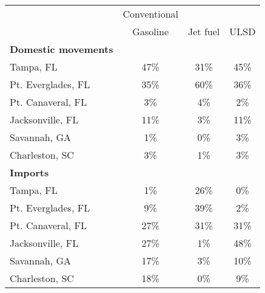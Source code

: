 \begin{tabular}{lccc}
\hline
& Conventional & & \\
& Gasoline & Jet fuel & ULSD \\
\hline
\textbf{Domestic movements} &  &  &  \\
Tampa, FL & 47\% & 31\% & 45\% \\
Pt. Everglades, FL & 35\% & 60\% & 36\% \\
Pt. Canaveral, FL &  3\% &  4\% &  2\% \\
Jacksonville, FL & 11\% &  3\% & 11\% \\
Savannah, GA &  1\% &  0\% &  3\% \\
Charleston, SC &  3\% &  1\% &  3\% \\
\hline
\textbf{Imports} &  &  &  \\
Tampa, FL &  1\% & 26\% &  0\% \\
Pt. Everglades, FL &  9\% & 39\% &  2\% \\
Pt. Canaveral, FL & 27\% & 31\% & 31\% \\
Jacksonville, FL & 27\% &  1\% & 48\% \\
Savannah, GA & 17\% &  3\% & 10\% \\
Charleston, SC & 18\% &  0\% &  9\% \\
\hline
\end{tabular}